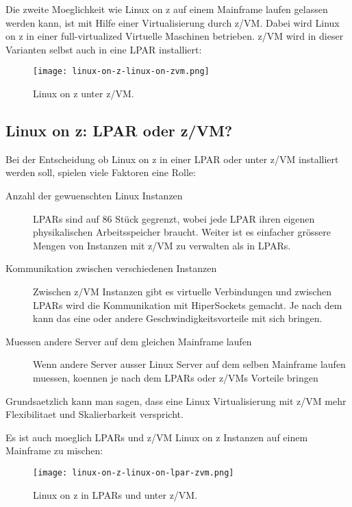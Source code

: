 Die zweite Moeglichkeit wie Linux on z auf einem Mainframe laufen gelassen werden kann, ist mit Hilfe einer Virtualisierung durch z/VM. Dabei wird Linux on z in einer full-virtualized Virtuelle Maschinen betrieben. z/VM wird in dieser Varianten selbst auch in eine LPAR installiert:

\begin{figure}[h!]
\centering
\texttt{[image: linux-on-z-linux-on-zvm.png]}
\caption{Linux on z unter z/VM\cite{LinuxOnZOnZVM}.}
\label{fig:LinuxOnZOnZVM}
\end{figure}

\subsection{Linux on z: LPAR oder z/VM?}

Bei der Entscheidung ob Linux on z in einer LPAR oder unter z/VM installiert werden soll, spielen viele Faktoren eine Rolle:

\begin{description}
    \item[Anzahl der gewuenschten Linux Instanzen]{LPARs sind auf 86 Stück gegrenzt, wobei jede LPAR ihren eigenen physikalischen Arbeitsspeicher braucht. Weiter ist es einfacher grössere Mengen von Instanzen mit z/VM zu verwalten als in LPARs.}
    \item[Kommunikation zwischen verschiedenen Instanzen]{Zwischen z/VM Instanzen gibt es virtuelle Verbindungen und zwischen LPARs wird die Kommunikation mit HiperSockets gemacht. Je nach dem kann das eine oder andere Geschwindigkeitsvorteile mit sich bringen.}
    \item[Muessen andere Server auf dem gleichen Mainframe laufen]{Wenn andere Server ausser Linux Server auf dem selben Mainframe laufen muessen, koennen je nach dem LPARs oder z/VMs Vorteile bringen}
\end{description}

Grundsaetzlich kann man sagen, dass eine Linux Virtualisierung mit z/VM mehr Flexibilitaet und Skalierbarkeit verspricht.\cite{IBMzVMLPAR}

Es ist auch moeglich LPARs und z/VM Linux on z Instanzen auf einem Mainframe zu mischen:

\begin{figure}[ht!]
\centering
\texttt{[image: linux-on-z-linux-on-lpar-zvm.png]}
\caption{Linux on z in LPARs und unter z/VM\cite{LinuxOnZOnLPARZVM}.}
\label{fig:LinuxOnZOnLPARZVM}
\end{figure}
